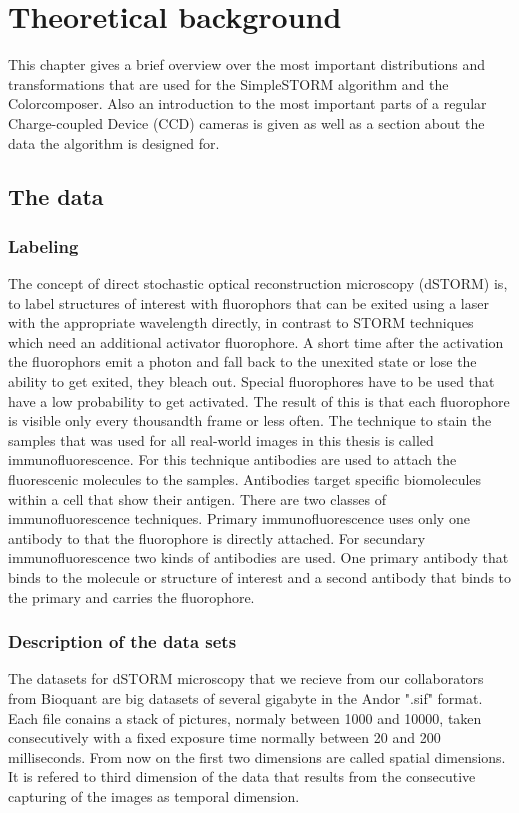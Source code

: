\chapter{Theoretical background}
This chapter gives a brief overview over the most important distributions and transformations that are used for the SimpleSTORM algorithm and the Colorcomposer. Also an introduction to the most important parts of a regular Charge-coupled Device (CCD) cameras is given as well as a section about the data the algorithm is designed for. 

\section{The data}
\subsection{Labeling}
The concept of direct stochastic optical reconstruction microscopy (dSTORM) \cite{heilemann} is, to label structures of interest with fluorophors that can be exited using a laser with the appropriate wavelength directly, in contrast to STORM techniques which need an additional activator fluorophore. A short time after the activation the fluorophors emit a photon and fall back to the unexited state or lose the ability to get exited, they bleach out. Special fluorophores have to be used that have a low probability to get activated. The result of this is that each fluorophore is visible only every thousandth frame or less often.\newline
The technique to stain the samples that was used for all real-world images in this thesis is called immunofluorescence. For this technique antibodies are used to attach the fluorescenic molecules to the samples. Antibodies target specific biomolecules within a cell that show their antigen. There are two classes of immunofluorescence techniques.\newline
Primary immunofluorescence uses only one antibody to that the fluorophore is directly attached.\newline
For secundary immunofluorescence two kinds of antibodies are used. One primary antibody that binds to the molecule or structure of interest and a second antibody that binds to the primary and carries the fluorophore.

\subsection{Description of the data sets}
The datasets for dSTORM microscopy that we recieve from our collaborators from
Bioquant are big datasets of several gigabyte in the Andor ".sif" format. Each
file conains a stack of pictures, normaly between 1000 and 10000, taken
consecutively with a fixed exposure time normally between 20 and 200 milliseconds. From now on the first two dimensions are called spatial dimensions. It is refered to third dimension of the data that results from the consecutive capturing of the images as temporal dimension.\newline

